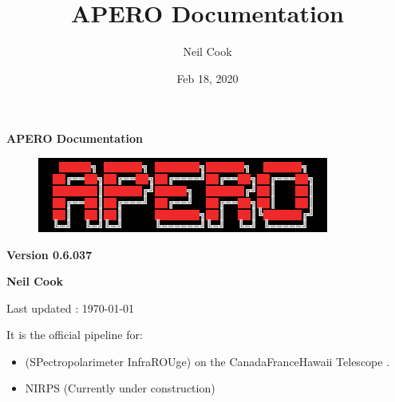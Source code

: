 \documentclass[a4paper,10pt,english]{report}
\title{APERO Documentation}
\date{Feb 18, 2020}
\author{Neil Cook}
\begin{document}
\pagestyle{empty}


        \begin{titlepage}
            \centering

            \vspace*{40mm} %
            \textbf{\Huge {APERO Documentation}}

            \vspace{5mm}
            \begin{figure}[!h]
                \centering
                \includegraphics[scale=1]{apero_logo.png}
            \end{figure}
            
            \vspace{5mm}
            \Large \textbf{Version 0.6.037}
            
            \vspace{5mm}
            \Large \textbf{{Neil Cook}}

            \vspace*{0mm}
            \small  Last updated : \MonthYearFormat\today


        \end{titlepage}

        \clearpage
        \tableofcontents

        
\pagestyle{plain}
 
\pagestyle{normal}
\label{\detokenize{index::doc}}


It is the official pipeline for:
\begin{itemize}
\item {} 
 (SPectropolarimeter InfraROUge) on the Canada\sphinxhyphen{}France\sphinxhyphen{}Hawaii Telescope .

\item {} 
NIRPS (Currently under construction)

\end{itemize}
\end{document}
